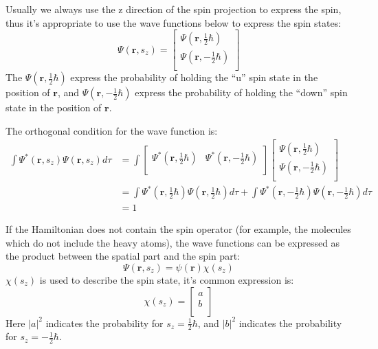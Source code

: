 Usually we always use the z direction of the spin projection to
express the spin, thus it's appropriate to use the wave functions
below to express the spin states:
\begin{equation}\label{}
\Psi(\mathbf{r},s_{z}) = \begin{bmatrix}
                        \Psi(\mathbf{r},\frac{1}{2}\hbar) \\
                        \Psi(\mathbf{r},-\frac{1}{2}\hbar) \\
                      \end{bmatrix}
\end{equation}
The $\Psi(\mathbf{r},\frac{1}{2}\hbar)$ express the probability of
holding the ``u'' spin state in the position of $\mathbf{r}$, and
$\Psi(\mathbf{r},-\frac{1}{2}\hbar)$ express the probability of
holding the ``down'' spin state in the position of $\mathbf{r}$.

The orthogonal condition for the wave function is:
\begin{align}\label{}
\int \Psi^{*}(\mathbf{r},s_{z})\Psi(\mathbf{r},s_{z})d\tau &= \int
\begin{bmatrix}
  \Psi^{*}(\mathbf{r},\frac{1}{2}\hbar) & \Psi^{*}(\mathbf{r},-\frac{1}{2}\hbar) \\
\end{bmatrix}
\begin{bmatrix}
\Psi(\mathbf{r},\frac{1}{2}\hbar) \\
\Psi(\mathbf{r},-\frac{1}{2}\hbar) \\
\end{bmatrix} \nonumber \\
&= \int
\Psi^{*}(\mathbf{r},\frac{1}{2}\hbar)\Psi(\mathbf{r},\frac{1}{2}\hbar)d\tau
+ \int
\Psi^{*}(\mathbf{r},-\frac{1}{2}\hbar)\Psi(\mathbf{r},-\frac{1}{2}\hbar)d\tau
\nonumber \\
&= 1
\end{align}

If the Hamiltonian does not contain the spin operator (for example,
the molecules which do not include the heavy atoms), the wave
functions can be expressed as the product between the spatial part
and the spin part:
\begin{equation}\label{}
\Psi(\mathbf{r},s_{z}) = \psi(\mathbf{r})\chi(s_{z})
\end{equation}
$\chi(s_{z})$ is used to describe the spin state, it's common
expression is:
\begin{equation}\label{SPINeq:8}
\chi(s_{z}) = \begin{bmatrix}
                a \\
                b \\
              \end{bmatrix}
\end{equation}
Here $|a|^{2}$ indicates the probability for $s_{z} =
\frac{1}{2}\hbar$, and $|b|^{2}$ indicates the probability for
$s_{z} = -\frac{1}{2}\hbar$.

